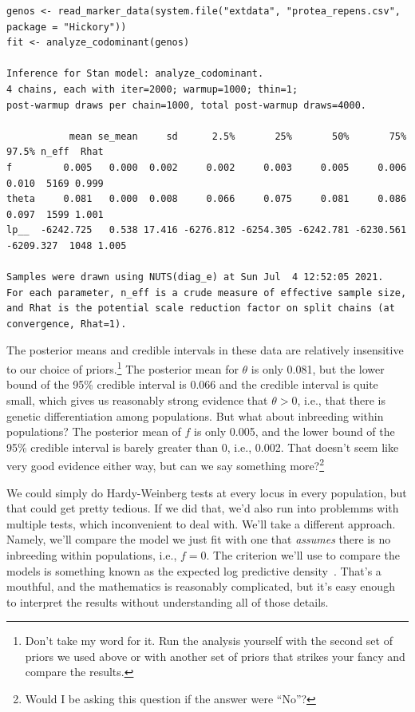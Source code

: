 \documentclass[12pt]{article}
\begin{document}
{\small
\begin{verbatim}
genos <- read_marker_data(system.file("extdata", "protea_repens.csv", package = "Hickory"))
fit <- analyze_codominant(genos)

Inference for Stan model: analyze_codominant.
4 chains, each with iter=2000; warmup=1000; thin=1; 
post-warmup draws per chain=1000, total post-warmup draws=4000.

           mean se_mean     sd      2.5%       25%       50%       75%     97.5% n_eff  Rhat
f         0.005   0.000  0.002     0.002     0.003     0.005     0.006     0.010  5169 0.999
theta     0.081   0.000  0.008     0.066     0.075     0.081     0.086     0.097  1599 1.001
lp__  -6242.725   0.538 17.416 -6276.812 -6254.305 -6242.781 -6230.561 -6209.327  1048 1.005

Samples were drawn using NUTS(diag_e) at Sun Jul  4 12:52:05 2021.
For each parameter, n_eff is a crude measure of effective sample size,
and Rhat is the potential scale reduction factor on split chains (at 
convergence, Rhat=1).
\end{verbatim}
}

The posterior means and credible intervals in these data are
relatively insensitive to our choice of priors.\footnote{Don't take my
  word for it. Run the analysis yourself with the second set of priors
  we used above or with another set of priors that strikes your fancy
  and compare the results.} The posterior mean for $\theta$ is only
0.081, but the lower bound of the 95\% credible interval is 0.066 and
the credible interval is quite small, which gives us reasonably strong
evidence that $\theta > 0$, i.e., that there is genetic
differentiation among populations. But what about inbreeding within
populations? The posterior mean of $f$ is only 0.005, and the lower
bound of the 95\% credible interval is barely greater than 0, i.e.,
0.002. That doesn't seem like very good evidence either way, but can
we say something more?\footnote{Would I be asking this question if the
  answer were ``No''?}

We could simply do Hardy-Weinberg tests at every locus in every
population, but that could get pretty tedious. If we did that, we'd
also run into problemms with multiple tests, which inconvenient to
deal with. We'll take a different approach. Namely, we'll compare the
model we just fit with one that {\it assumes\/} there is no inbreeding
within populations, i.e., $f = 0$. The criterion we'll use to compare
the models is something known as the expected log predictive
density~\cite{Vehtari-etal-2017}. That's a mouthful, and the
mathematics is reasonably complicated, but it's easy enough to
interpret the results without understanding all of those details.
\end{document}
